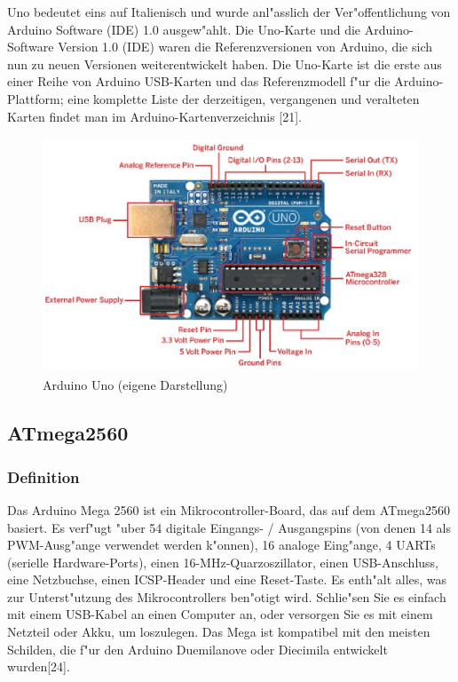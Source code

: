  Uno bedeutet eins auf Italienisch und wurde anl"asslich 
 der Ver"offentlichung von Arduino Software (IDE) 1.0 ausgew"ahlt. 
 Die Uno-Karte und die Arduino-Software Version 1.0 (IDE)
 waren die Referenzversionen von Arduino, 
 die sich nun zu neuen Versionen weiterentwickelt haben. 
 Die Uno-Karte ist die erste aus einer Reihe von Arduino USB-Karten 
 und das Referenzmodell f"ur die Arduino-Plattform; eine komplette 
 Liste der derzeitigen, vergangenen und veralteten Karten findet man 
 im Arduino-Kartenverzeichnis [21].
\begin{figure}[!htb]
\begin{center}
\includegraphics[height=7cm]{bilder/Uno.eps}
\end{center}
\caption{Arduino Uno (eigene Darstellung)}\label{fig:Uno}
\end{figure}



\subsection{ATmega2560}
\subsubsection{Definition}

Das Arduino Mega 2560 ist ein Mikrocontroller-Board, das auf dem 
ATmega2560 basiert. Es verf"ugt "uber 54 digitale Eingangs- / Ausgangspins 
(von denen 14 als PWM-Ausg"ange verwendet werden k"onnen), 16 analoge Eing"ange,
 4 UARTs (serielle Hardware-Ports), einen 16-MHz-Quarzoszillator, 
 einen USB-Anschluss, eine Netzbuchse, einen ICSP-Header und 
 eine Reset-Taste. Es enth"alt alles, was zur Unterst"utzung des 
 Mikrocontrollers ben"otigt wird. Schlie"sen Sie es einfach mit 
 einem USB-Kabel an einen Computer an, oder versorgen Sie es mit 
 einem Netzteil oder Akku, um loszulegen. Das Mega ist kompatibel mit 
 den meisten Schilden, die f"ur den Arduino Duemilanove 
 oder Diecimila entwickelt wurden[24].

